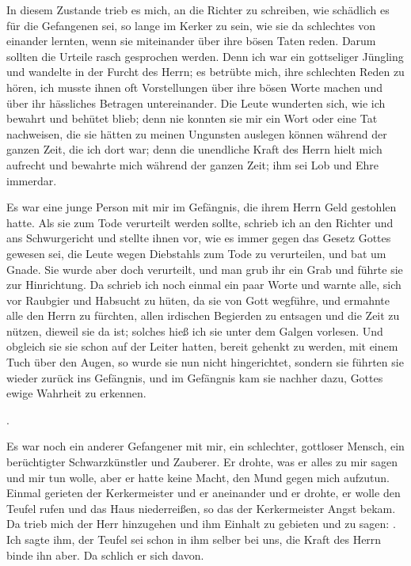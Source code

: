 \medmuskip

In diesem Zustande trieb es mich, an die Richter zu schreiben,
wie schädlich es für die Gefangenen sei, so lange im Kerker zu
sein, wie sie da schlechtes von einander lernten, wenn sie 
miteinander über ihre bösen Taten reden. Darum sollten die Urteile
rasch gesprochen werden. Denn ich war ein gottseliger Jüngling
und wandelte in der Furcht des Herrn; es betrübte mich, ihre
schlechten Reden zu hören, ich musste ihnen oft Vorstellungen über
ihre bösen Worte machen und über ihr hässliches Betragen 
untereinander. Die Leute wunderten sich, wie ich bewahrt und behütet
blieb; denn nie konnten sie mir ein Wort oder eine Tat 
nachweisen, die sie hätten zu meinen Ungunsten auslegen können
während der ganzen Zeit, die ich dort war; denn die unendliche
Kraft des Herrn hielt mich aufrecht und bewahrte mich während
der ganzen Zeit; ihm sei Lob und Ehre immerdar.

\medmuskip

Es war eine junge Person mit mir im Gefängnis, die ihrem
Herrn Geld gestohlen hatte. Als sie zum Tode verurteilt werden
sollte, schrieb ich an den Richter und ans Schwurgericht und
stellte ihnen vor, wie es immer gegen das Gesetz Gottes gewesen
sei, die Leute wegen Diebstahls zum Tode zu verurteilen, und
bat um Gnade. Sie wurde aber doch 
verurteilt, und man grub
ihr ein Grab und führte sie zur Hinrichtung. Da schrieb ich noch
einmal ein paar Worte und warnte alle, sich vor Raubgier und
Habsucht zu hüten, da sie von Gott wegführe, und ermahnte alle
den Herrn zu fürchten, allen irdischen Begierden zu entsagen und
die Zeit zu nützen, dieweil sie da ist; solches hieß ich sie unter
dem Galgen vorlesen. Und obgleich sie sie schon auf der Leiter
hatten, bereit gehenkt zu werden, mit einem Tuch über den Augen,
so wurde sie nun nicht hingerichtet, sondern sie führten sie wieder
zurück ins Gefängnis, und im Gefängnis kam sie nachher dazu,
Gottes ewige Wahrheit zu erkennen.

\medmuskipnen.

Es war noch ein anderer Gefangener mit mir, ein schlechter,
gottloser Mensch, ein berüchtigter Schwarzkünstler 
und Zauberer.
Er drohte, was er alles zu mir sagen und mir tun wolle, aber
er hatte keine Macht, den Mund gegen mich aufzutun. Einmal
gerieten der Kerkermeister und er aneinander und er drohte, er
wolle den Teufel rufen und das Haus niederreißen, so das der
Kerkermeister Angst bekam. Da trieb mich der Herr hinzugehen
und ihm Einhalt zu gebieten und zu sagen: . Ich sagte ihm, der Teufel
sei schon in ihm selber bei uns, die Kraft des Herrn binde ihn
aber. Da schlich er sich davon.

